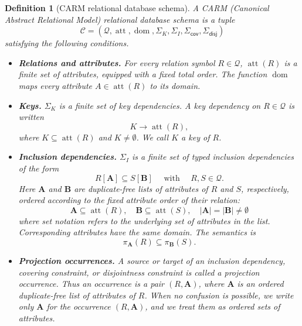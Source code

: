 \documentclass[10pt]{article}
\newtheorem{definition}{Definition}
\begin{document}
\begin{definition}[\textsf{CARM} relational database schema]
A \textsf{CARM} (Canonical Abstract Relational Model) relational database schema is a tuple
\[
\mathcal C =
(\mathcal Q,\operatorname{att},\operatorname{dom},
 \Sigma_K,\Sigma_I,\Sigma_{\mathsf{cov}},\Sigma_{\mathsf{disj}})
\]
satisfying the following conditions.

\begin{itemize}

\item \textbf{Relations and attributes.}
For every relation symbol \(R\in\mathcal Q\),
\(\operatorname{att}(R)\) is a finite set of attributes, equipped with a
fixed total order.  The function \(\operatorname{dom}\) maps every
attribute \(A\in\operatorname{att}(R)\) to its domain.

\item \textbf{Keys.}
\(\Sigma_K\) is a finite set of key dependencies.  A key dependency on
\(R\in\mathcal Q\) is written
\[
K \to \operatorname{att}(R),
\]
where \(K\subseteq \operatorname{att}(R)\) and $K\neq \emptyset$.  We call \(K\) a key of \(R\).

%
\item \textbf{Inclusion dependencies.}
\(\Sigma_I\) is a finite set of typed inclusion dependencies of the form
\[
R[\mathbf A] \subseteq S[\mathbf B]\quad\text{ with }\quad
R,S\in\mathcal Q.
\]
Here \(\mathbf A\) and \(\mathbf B\) are duplicate-free lists of
attributes of \(R\) and \(S\), respectively, ordered according to the
fixed attribute order of their relation:
\[
\mathbf A\subseteq \operatorname{att}(R),\quad
\mathbf B\subseteq \operatorname{att}(S),\quad
|\mathbf A|=|\mathbf B|\neq\emptyset
\]
where set notation refers to the underlying set of attributes in the
list.  Corresponding attributes have the same domain.  The semantics is
\[
\pi_{\mathbf A}(R)\subseteq \pi_{\mathbf B}(S).
\]

\item \textbf{Projection occurrences.}
A source or target of an inclusion dependency, covering constraint, or
disjointness constraint is called a projection occurrence.  Thus an
occurrence is a pair \((R,\mathbf A)\), where \(\mathbf A\) is an ordered
duplicate-free list of attributes of \(R\).  When no confusion is
possible, we write only \(\mathbf A\) for the occurrence
\((R,\mathbf A)\), and we treat them as ordered sets of attributes.


\end{itemize}
\end{definition}
\end{document}
